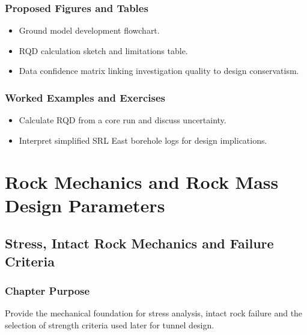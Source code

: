 \documentclass[12pt,oneside]{book}
\begin{document}
\section{Proposed Figures and Tables}
\begin{itemize}
    \item Ground model development flowchart.
    \item RQD calculation sketch and limitations table.
    \item Data confidence matrix linking investigation quality to design conservatism.
\end{itemize}

\section{Worked Examples and Exercises}
\begin{itemize}
    \item Calculate RQD from a core run and discuss uncertainty.
    \item Interpret simplified SRL East borehole logs for design implications.
\end{itemize}

\part{Rock Mechanics and Rock Mass Design Parameters}

\chapter{Stress, Intact Rock Mechanics and Failure Criteria}

\section{Chapter Purpose}
Provide the mechanical foundation for stress analysis, intact rock failure and the selection of strength criteria used later for tunnel design.
\end{document}
